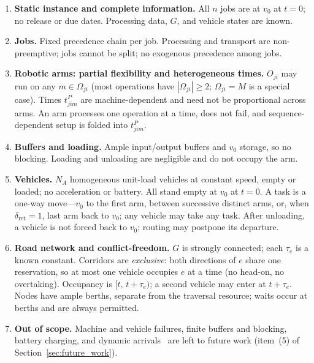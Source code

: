 \documentclass[manuscript,screen,review]{acmart}
\begin{document}
\begin{enumerate}[label=\textbf{A\arabic*.},leftmargin=*,topsep=2pt,itemsep=1pt]
\item \textbf{Static instance and complete information.} All $n$ jobs are at $v_0$ at $t=0$; no release or due dates. Processing data, $G$, and vehicle states are known.

\item \textbf{Jobs.} Fixed precedence chain per job. Processing and transport are non-preemptive; jobs cannot be split; no exogenous precedence among jobs.

\item \textbf{Robotic arms: partial flexibility and heterogeneous times.} $O_{ji}$ may run on any $m\in\Omega_{ji}$ (most operations have $|\Omega_{ji}|\ge 2$; $\Omega_{ji}=M$ is a special case). Times $t^P_{jim}$ are machine-dependent and need not be proportional across arms. An arm processes one operation at a time, does not fail, and sequence-dependent setup is folded into $t^P_{jim}$.

\item \textbf{Buffers and loading.} Ample input/output buffers and $v_0$ storage, so no blocking. Loading and unloading are negligible and do not occupy the arm.

\item \textbf{Vehicles.} $N_A$ homogeneous unit-load vehicles at constant speed, empty or loaded; no acceleration or battery. All stand empty at $v_0$ at $t=0$. A task is a one-way move---$v_0$ to the first arm, between successive distinct arms, or, when $\delta_{\mathrm{ret}}=1$, last arm back to $v_0$; any vehicle may take any task. After unloading, a vehicle is not forced back to $v_0$; routing may postpone its departure.

\item \textbf{Road network and conflict-freedom.} $G$ is strongly connected; each $\tau_e$ is a known constant. Corridors are \emph{exclusive}: both directions of $e$ share one reservation, so at most one vehicle occupies $e$ at a time (no head-on, no overtaking). Occupancy is $[t,\,t+\tau_e)$; a second vehicle may enter at $t+\tau_e$. Nodes have ample berths, separate from the traversal resource; waits occur at berths and are always permitted.

\item \textbf{Out of scope.} Machine and vehicle failures, finite buffers and blocking, battery charging, and dynamic arrivals~\cite{gui2023dynamic,xiong2024dynamic} are left to future work (item~(5) of Section~\ref{sec:future_work}).
\end{enumerate}
\end{document}

